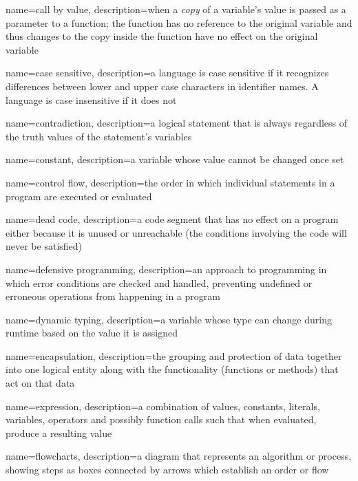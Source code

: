 {
  name=call by value,
  description={when a \emph{copy} of a variable's value is passed as a parameter to a function; the function has no reference to the original variable and thus changes to the copy inside the function have no effect on the original variable}
}

{
  name=case sensitive,
  description={a language is case sensitive if it recognizes differences between lower and upper case characters in 
  	identifier names.  A language is case insensitive if it does not}
}

{
  name=contradiction,
  description={a logical statement that is always \False regardless of the truth values of the statement's variables}
}

{
  name=constant,
  description={a variable whose value cannot be changed once set}
}

{
  name=control flow,
  description={the order in which individual statements in a program are executed or evaluated}
}

{
  name=dead code,
  description={a code segment that has no effect on a program either because it is unused or unreachable (the 
	conditions involving the code will never be satisfied)}
}

{
  name=defensive programming,
  description={an approach to programming in which error conditions are checked and handled, preventing undefined or
  	erroneous operations from happening in a program}
}

{
  name=dynamic typing,
  description={a variable whose type can change during runtime based on the value it is assigned}
}

{
  name=encapsulation,
  description={the grouping and protection of data together into one logical entity along with the functionality (functions or methods)
  	that act on that data}
}

{
  name=expression,
  description={a combination of values, constants, literals, variables, operators and possibly function calls such that when evaluated, produce a resulting value}
}

{
  name=flowcharts,
  description={a diagram that represents an algorithm or process, showing steps as boxes connected by arrows which establish an
  order or flow}
}

